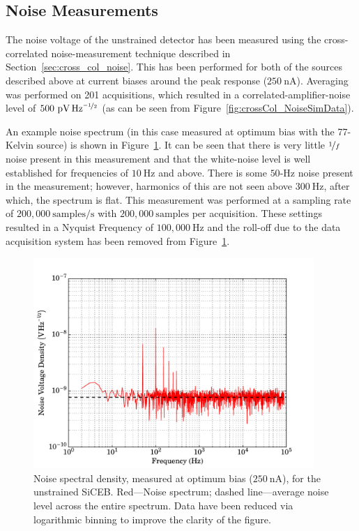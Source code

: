 \subsection{Noise Measurements}\label{ssec:opticalControlSi_noise}
The noise voltage of the unstrained detector has been measured using the cross-correlated noise-measurement technique described in Section~\ref{sec:cross_col_noise}. This has been performed for both of the sources described above at current biases around the peak response ($250~\mathrm{nA}$). Averaging was performed on 201 acquisitions, which resulted in a correlated-amplifier-noise level of $500~\mathrm{pV\,Hz^{\nicefrac{-1}{2}}}$ (as can be seen from Figure~\ref{fig:crossCol_NoiseSimData}). 
\par 
An example noise spectrum (in this case measured at optimum bias with the 77-Kelvin source) is shown in Figure~\ref{fig:controlNoisePlot77}. It can be seen that there is very little $\nicefrac{1}{f}$ noise present in this measurement and that the white-noise level is well established for frequencies of $10~\mathrm{Hz}$ and above. There is some $50\mbox{-}\mathrm{Hz}$ noise present in the measurement; however, harmonics of this are not seen above $300~\mathrm{Hz}$, after which, the spectrum is flat. This measurement was performed at a sampling rate of $200,000~\mathrm{samples/s}$ with $200,000~\mathrm{samples}$ per acquisition. These settings resulted in a Nyquist Frequency of $100,000~\mathrm{Hz}$ and the roll-off due to the data acquisition system has been removed from Figure~\ref{fig:controlNoisePlot77}.
\begin{figure}[tb]
\begin{center}
\includegraphics[width = 0.95\textwidth]{figures/control_noisePlot77}
\caption[Noise spectrum, measured at optimum bias, for the unstrained SiCEB]{Noise spectral density, measured at optimum bias ($250~\mathrm{nA}$), for the unstrained SiCEB. Red---Noise spectrum; dashed line---average noise level across the entire spectrum. Data have been reduced via logarithmic binning to improve the clarity of the figure.}
\label{fig:controlNoisePlot77}
\end{center}
\end{figure}
